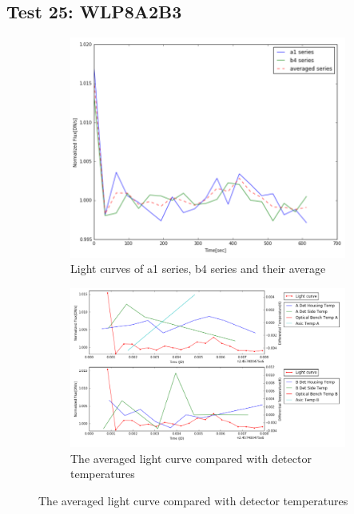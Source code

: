 \documentclass{aastex6}
\begin{document}
\subsection{Test 25: WLP8A2B3} 
\begin{figure}[H]
    \centering
    \begin{subfigure}{1}
        \includegraphics[scale=0.4]{ts_test25}
        \caption{Light curves of a1 series, b4 series and their average}
    \end{subfigure}

    \begin{subfigure}{2}
        \includegraphics[scale=0.4]{temp_test25}
        \caption{The averaged light curve compared with detector temperatures}
    \end{subfigure}
   

\end{figure}
\end{document}
